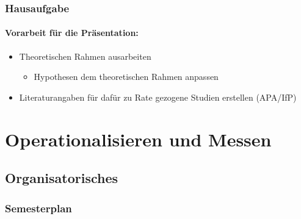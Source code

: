 \documentclass[
]{book}
\providecommand{\tightlist}{%
  \setlength{\itemsep}{0pt}\setlength{\parskip}{0pt}}
\begin{document}
\hypertarget{hausaufgabe}{%
\subsection{Hausaufgabe}\label{hausaufgabe}}

\hypertarget{vorarbeit-fuxfcr-die-pruxe4sentation}{%
\subsubsection{Vorarbeit für die Präsentation:}\label{vorarbeit-fuxfcr-die-pruxe4sentation}}

\begin{itemize}
\item
  Theoretischen Rahmen ausarbeiten

  \begin{itemize}
  \tightlist
  \item
    Hypothesen dem theoretischen Rahmen anpassen
  \end{itemize}
\item
  Literaturangaben für dafür zu Rate gezogene Studien erstellen (APA/IfP)
\end{itemize}

\hypertarget{operationalisieren-und-messen}{%
\chapter{Operationalisieren und Messen}\label{operationalisieren-und-messen}}

\hypertarget{organisatorisches-4}{%
\section{Organisatorisches}\label{organisatorisches-4}}

\hypertarget{semesterplan-5}{%
\subsection{Semesterplan}\label{semesterplan-5}}
\end{document}
